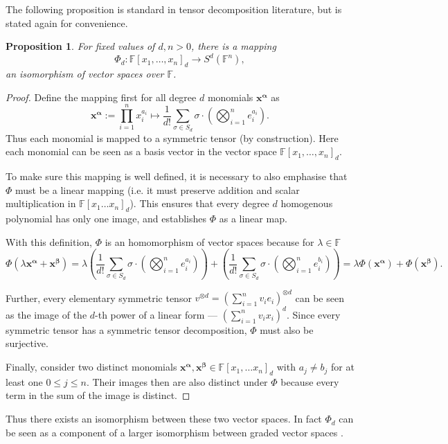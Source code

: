 \documentclass[12pt,a4paper,oneside]{book}
\def\field{\mathbb{F}} %
\newtheorem{proposition}{Proposition}[section]
\theoremstyle{definition}
\begin{document}
The following proposition is standard in tensor decomposition literature, but is stated again for convenience.
\begin{proposition}
    For fixed values of $d, n > 0$, there is a mapping $$\Phi_d: \field[x_1, \ldots, x_n]_d \to S^d(\field^n),$$ an isomorphism of vector spaces over $\field$.
\end{proposition}
\begin{proof}
    Define the mapping first for all degree $d$ monomials $\mathbf{x^{\alpha}}$ as
    $$\mathbf{x^{\alpha}}:= \prod_{i=1}^{n}x_i^{a_i} \mapsto \frac{1}{d!}\sum_{\sigma \in S_d} \sigma \cdot (\bigotimes_{i=1}^n e_i^{a_i}).$$Thus each monomial is mapped to a symmetric tensor (by construction). Here each monomial can be seen as a basis vector in the vector space $\field[x_1, \ldots, x_n]_d$.
    
    To make sure this mapping is well defined, it is necessary to also emphasise that $\Phi$ must be a linear mapping (i.e. it must preserve addition and scalar multiplication in $\field[x_1 \ldots x_n]_d$). This ensures that every degree $d$ homogenous polynomial has only one image, and establishes $\Phi$ as a linear map.

    With this definition, $\Phi$ is an homomorphism of vector spaces because for $\lambda \in \field$ $$\Phi(\lambda \mathbf{x^{\alpha}} + \mathbf{x^{\beta}}) = \lambda \left( \frac{1}{d!}\sum_{\sigma \in S_d} \sigma \cdot (\bigotimes_{i=1}^n e_i^{a_i})\right) + \left( \frac{1}{d!}\sum_{\sigma \in S_d} \sigma \cdot (\bigotimes_{i=1}^n e_i^{b_i})\right) = \lambda\Phi(\mathbf{x^{\alpha}}) + \Phi(\mathbf{x^{\beta}}). $$

    Further, every elementary symmetric tensor $v^{\otimes d} = (\sum_{i=1}^{n}v_ie_i)^{\otimes d}$ can be seen as the image of the $d$-th power of a linear form --- $\left(\sum_{i=1}^{n} v_ix_i \right)^d$. Since every symmetric tensor has a symmetric tensor decomposition, $\Phi$ must also be surjective. 
    
    Finally, consider two distinct monomials $\mathbf{x}^{\mathbf{\alpha}}, \mathbf{x}^{\mathbf{\beta}} \in \field[x_1, \ldots x_n]_d$ with $a_j \neq b_j$ for at least one $0 \leq j \leq n$. Their images then are also distinct under $\Phi$ because every term in the sum of the image is distinct.
\end{proof}
Thus there exists an isomorphism between these two vector spaces. In fact $\Phi_d$ can be seen as a component of a larger isomorphism between graded vector spaces \cite{comon_symmetric_2008}.
\end{document}
